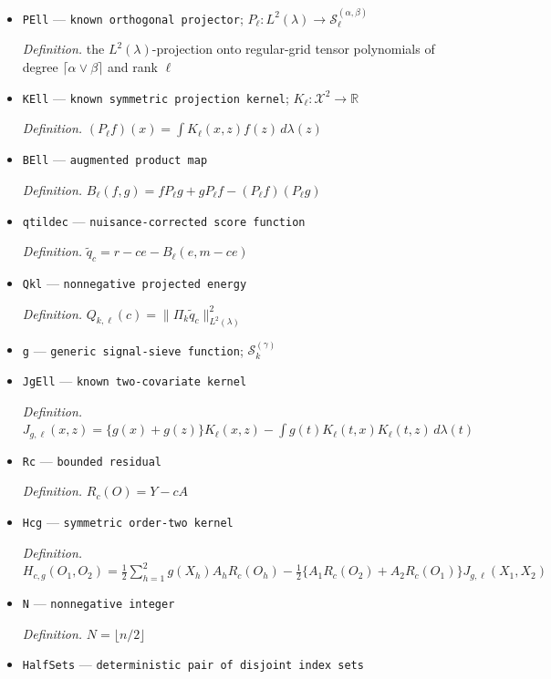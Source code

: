 \documentclass{article}
\begin{document}
\begin{itemize}
  \item \texttt{PEll} --- \texttt{known orthogonal projector}; \(P_\ell:L^2(\lambda)\to\mathcal S_\ell^{(\alpha,\beta)}\)
  \par\smallskip\noindent\emph{Definition.} the \(L^2(\lambda)\)-projection onto regular-grid tensor polynomials of degree \(\lceil\alpha\vee\beta\rceil\) and rank \(\ell\)
  \item \texttt{KEll} --- \texttt{known symmetric projection kernel}; \(K_\ell:\mathcal X^2\to\mathbb R\)
  \par\smallskip\noindent\emph{Definition.} \((P_\ell f)(x)=\int K_\ell(x,z)f(z)\,d\lambda(z)\)
  \item \texttt{BEll} --- \texttt{augmented product map}
  \par\smallskip\noindent\emph{Definition.} \(B_\ell(f,g)=fP_\ell g+gP_\ell f-(P_\ell f)(P_\ell g)\)
  \item \texttt{qtildec} --- \texttt{nuisance-\allowbreak{}corrected score function}
  \par\smallskip\noindent\emph{Definition.} \(\widetilde q_c=r-ce-B_\ell(e,m-ce)\)
  \item \texttt{Qkl} --- \texttt{nonnegative projected energy}
  \par\smallskip\noindent\emph{Definition.} \(Q_{k,\ell}(c)=\|\Pi_k\widetilde q_c\|_{L^2(\lambda)}^2\)
  \item \texttt{g} --- \texttt{generic signal-\allowbreak{}sieve function}; \(\mathcal S_k^{(\gamma)}\)
  \item \texttt{JgEll} --- \texttt{known two-\allowbreak{}covariate kernel}
  \par\smallskip\noindent\emph{Definition.} \(J_{g,\ell}(x,z)=\{g(x)+g(z)\}K_\ell(x,z)-\int g(t)K_\ell(t,x)K_\ell(t,z)\,d\lambda(t)\)
  \item \texttt{Rc} --- \texttt{bounded residual}
  \par\smallskip\noindent\emph{Definition.} \(R_c(O)=Y-cA\)
  \item \texttt{Hcg} --- \texttt{symmetric order-\allowbreak{}two kernel}
  \par\smallskip\noindent\emph{Definition.} \(H_{c,g}(O_1,O_2)=\tfrac12\sum_{h=1}^2 g(X_h)A_hR_c(O_h)-\tfrac12\{A_1R_c(O_2)+A_2R_c(O_1)\}J_{g,\ell}(X_1,X_2)\)
  \item \texttt{N} --- \texttt{nonnegative integer}
  \par\smallskip\noindent\emph{Definition.} \(N=\lfloor n/2\rfloor\)
  \item \texttt{HalfSets} --- \texttt{deterministic pair of disjoint index sets}

\end{itemize}
\end{document}
